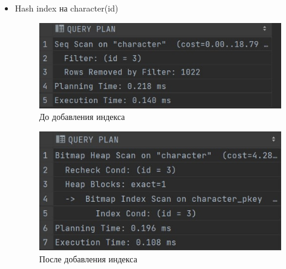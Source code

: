 \begin{itemize}
    \newpage
    
    \item Hash index на character(id)
    \begin{figure}[H]
	\begin{center}
		\includegraphics[scale=0.8]{images/character_id_before.jpg}
            \caption{До добавления индекса}
	\end{center}
    \end{figure}
    \begin{figure}[H]
	\begin{center}
		\includegraphics[scale=0.8]{images/character_id_after.jpg}
            \caption{После добавления индекса}
	\end{center}
    \end{figure}
    

\end{itemize}
